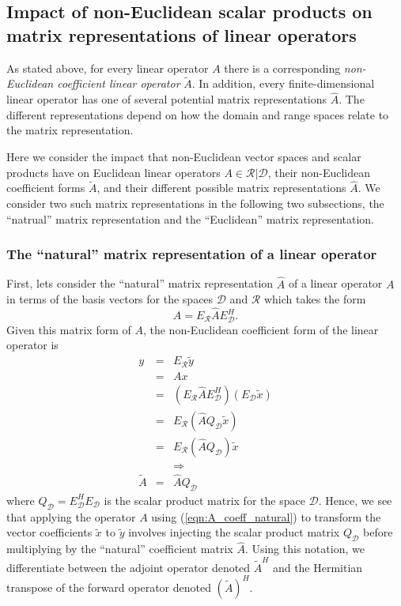 \subsection{Impact of non-Euclidean scalar products on matrix representations of linear operators}
\label{sec:matrix_representations_of_linear_operators}

As stated above, for every linear operator $A$ there is a corresponding
{}\textit{non-Euclidean coefficient linear operator} $\tilde{A}$.  In
addition, every finite-dimensional linear operator has one of several
potential matrix representations $\hat{A}$.  The different representations
depend on how the domain and range spaces relate to the matrix representation.

Here we consider the impact that non-Euclidean vector spaces and scalar
products have on Euclidean linear operators $A\in\mathcal{R}|\mathcal{D}$,
their non-Euclidean coefficient forms $\tilde{A}$, and their different
possible matrix representations $\hat{A}$.  We consider two such matrix
representations in the following two subsections, the ``natrual'' matrix
representation and the ``Euclidean'' matrix representation.

\subsubsection{The ``natural'' matrix representation of a linear operator}

First, lets consider the ``natural'' matrix representation $\hat{A}$ of a
linear operator $A$ in terms of the basis vectors for the spaces $\mathcal{D}$
and $\mathcal{R}$ which takes the form
%
\begin{equation}
A = E_{\mathcal{R}} \hat{A} E_{\mathcal{D}}^H.
\label{eqn:A_coeff_natural}
\end{equation}
%
Given this matrix form of $A$, the non-Euclidean coefficient form of the
linear operator is
%
\begin{eqnarray}
y
& = & E_{\mathcal{R}} \tilde{y} \nonumber \\
& = & A x \nonumber \\
& = & ( E_{\mathcal{R}} \hat{A} E_{\mathcal{D}}^H ) ( E_{\mathcal{D}} \tilde{x} ) \nonumber \\
& = & E_{\mathcal{R}} ( \hat{A} Q_{\mathcal{D}} \tilde{x} ) \nonumber \\
& = & E_{\mathcal{R}} ( \hat{A} Q_{\mathcal{D}} ) \tilde{x} \nonumber \\
&  & \Rightarrow \nonumber \\
\tilde{A} & = & \hat{A} Q_{\mathcal{D}}
\label{eqn:A_natural_apply}
\end{eqnarray}
%
where $Q_{\mathcal{D}} = E_{\mathcal{D}}^H E_{\mathcal{D}}$ is the scalar
product matrix for the space $\mathcal{D}$.  Hence, we see that applying the
operator $A$ using (\ref{eqn:A_coeff_natural}) to transform the vector
coefficients $\tilde{x}$ to $\tilde{y}$ involves injecting the scalar product
matrix $Q_{\mathcal{D}}$ before multiplying by the ``natural'' coefficient
matrix $\hat{A}$.  Using this notation, we differentiate between the adjoint
operator denoted $\tilde{A}^H$ and the Hermitian transpose of the forward
operator denoted $(\tilde{A})^H$.

